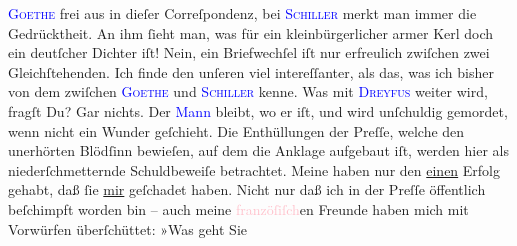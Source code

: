                   \textsc{\textcolor{blue}{Goethe}{}\ledrightnote{\textcolor{blue}{Johann Wolfgang von Goethe}}} frei aus in dieſer Correſpondenz, {\pb}bei \textsc{\textcolor{blue}{Schiller}{}\ledrightnote{\textcolor{blue}{Friedrich von Schiller}}} merkt man immer die Gedrücktheit. An ihm ſieht man, was für ein
               kleinbürgerlicher \strikeout{\textcolor{gray}{a}} armer Kerl doch ein deutſcher Dichter iſt! Nein, ein Briefwechſel iſt nur
               erfreulich zwiſchen zwei Gleichſtehenden. Ich finde den unſeren viel intereſſanter,
               als das, was ich bisher von dem zwiſchen \textsc{\textcolor{blue}{Goethe}{}\ledrightnote{\textcolor{blue}{Johann Wolfgang von Goethe}}} und \textsc{\textcolor{blue}{Schiller}{}\ledrightnote{\textcolor{blue}{Friedrich von Schiller}}} kenne.\pend
           \pstart
           Was mit \textsc{\textcolor{blue}{Dreyfus}{}\ledrightnote{\textcolor{blue}{Alfred Dreyfus}}} weiter wird, fragſt Du? Gar nichts. Der \textcolor{blue}{Mann}{} bleibt, wo er iſt, und wird unſchuldig gemordet, wenn
               nicht ein Wunder geſchieht. Die Enthüllungen der Preſſe, welche den {\pb}unerhörten Blödſinn bewieſen, auf dem die Anklage
               aufgebaut iſt, werden hier als niederſchmetternde Schuldbeweiſe betrachtet. Meine
                  \label{K_L02786-14v}\label{K_L02786-14h} haben nur den \uline{einen} Erfolg gehabt, daß ſie \uline{mir} geſchadet haben. Nicht nur daß ich in der Preſſe öffentlich
               beſchimpft worden bin – auch meine \textcolor{pink}{franzöſiſch}{}en Freunde haben mich mit Vorwürfen überſchüttet: »Was geht Sie
